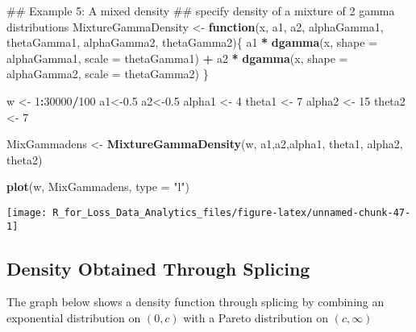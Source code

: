 \documentclass[]{book}
\newenvironment{Shaded}{\begin{snugshade}}{\end{snugshade}}
\newcommand{\KeywordTok}[1]{\textcolor[rgb]{0.13,0.29,0.53}{\textbf{#1}}}
\newcommand{\DataTypeTok}[1]{\textcolor[rgb]{0.13,0.29,0.53}{#1}}
\newcommand{\DecValTok}[1]{\textcolor[rgb]{0.00,0.00,0.81}{#1}}
\newcommand{\FloatTok}[1]{\textcolor[rgb]{0.00,0.00,0.81}{#1}}
\newcommand{\StringTok}[1]{\textcolor[rgb]{0.31,0.60,0.02}{#1}}
\newcommand{\ControlFlowTok}[1]{\textcolor[rgb]{0.13,0.29,0.53}{\textbf{#1}}}
\newcommand{\OperatorTok}[1]{\textcolor[rgb]{0.81,0.36,0.00}{\textbf{#1}}}
\newcommand{\NormalTok}[1]{#1}
\theoremstyle{definition}
\theoremstyle{definition}
\theoremstyle{definition}
\theoremstyle{remark}
\begin{document}
\begin{Shaded}
\begin{Highlighting}[]
\NormalTok{## Example 5: A mixed density}
\NormalTok{## specify density of a mixture of 2 gamma distributions}
\NormalTok{MixtureGammaDensity <-}\StringTok{ }\ControlFlowTok{function}\NormalTok{(x, a1, a2, alphaGamma1, thetaGamma1, alphaGamma2, thetaGamma2)\{}
\NormalTok{  a1 }\OperatorTok{*}\StringTok{ }\KeywordTok{dgamma}\NormalTok{(x, }\DataTypeTok{shape =}\NormalTok{ alphaGamma1, }\DataTypeTok{scale =}\NormalTok{ thetaGamma1) }\OperatorTok{+}\StringTok{ }\NormalTok{a2 }\OperatorTok{*}\StringTok{ }\KeywordTok{dgamma}\NormalTok{(x, }\DataTypeTok{shape =}\NormalTok{ alphaGamma2, }\DataTypeTok{scale =}\NormalTok{ thetaGamma2)}
\NormalTok{\}}

\NormalTok{w <-}\StringTok{ }\DecValTok{1}\OperatorTok{:}\DecValTok{30000}\OperatorTok{/}\DecValTok{100}
\NormalTok{a1<-}\FloatTok{0.5}
\NormalTok{a2<-}\FloatTok{0.5}
\NormalTok{alpha1 <-}\StringTok{ }\DecValTok{4}
\NormalTok{theta1 <-}\StringTok{ }\DecValTok{7}
\NormalTok{alpha2 <-}\StringTok{ }\DecValTok{15}
\NormalTok{theta2 <-}\StringTok{ }\DecValTok{7}

\NormalTok{MixGammadens <-}\StringTok{ }\KeywordTok{MixtureGammaDensity}\NormalTok{(w, a1,a2,alpha1, theta1, alpha2, theta2)}

\KeywordTok{plot}\NormalTok{(w, MixGammadens, }\DataTypeTok{type =} \StringTok{"l"}\NormalTok{)}
\end{Highlighting}
\end{Shaded}

\begin{center}\texttt{[image: R\_for\_Loss\_Data\_Analytics\_files/figure-latex/unnamed-chunk-47-1]} \end{center}

\subsection{Density Obtained Through
Splicing}\label{density-obtained-through-splicing}

The graph below shows a density function through splicing by combining
an exponential distribution on \((0,c)\) with a Pareto distribution on
\((c,\infty)\)
\end{document}

